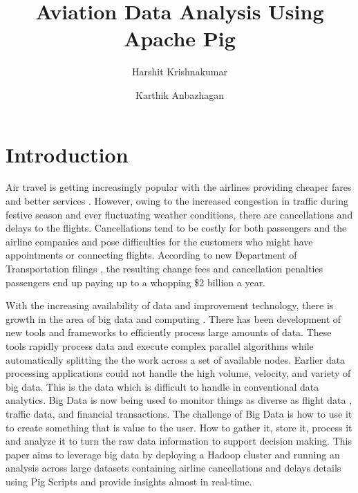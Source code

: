 \documentclass[9pt,twocolumn,twoside]{../../styles/osajnl}
\title{Aviation Data Analysis Using Apache Pig}
\author[1*]{Harshit Krishnakumar}
\author[2]{Karthik Anbazhagan}
\affil[1]{School of Informatics and Computing, Bloomington, IN 47408, U.S.A.}
\affil[2]{School of Informatics and Computing, Bloomington, IN 47408, U.S.A.}
\affil[*]{Corresponding authors: harkrish@iu.edu, kartanba@iu.edu}
\begin{document}
\flushbottom %

\maketitle %

\tableofcontents %
\maketitle

\section{Introduction}
Air travel is getting increasingly popular with the airlines providing cheaper fares and better services \cite{www-aviation-price}. However, owing to the increased congestion in traffic during festive season and ever fluctuating weather conditions, there are cancellations and delays to the flights. Cancellations tend to be costly for both passengers and the airline companies and pose difficulties for the customers who might have appointments or connecting flights. According to new Department of Transportation filings \cite{www-airline}, the resulting change fees and cancellation penalties passengers end up paying up to a whopping \$2 billion a year. 

With the increasing availability of data and improvement technology, there is growth in the area of big data and computing \cite{www-hdfs-arch}. There has been development of new tools and frameworks to efficiently process large amounts of data. These tools rapidly process data and execute complex parallel algorithms while automatically splitting the the work across a set of available nodes. Earlier data processing applications could not handle the high volume, velocity, and variety of big data. This is the data which is difficult to handle in conventional data analytics. Big Data is now being used to monitor things as diverse as flight data \cite{www-aviation}, traffic data, and financial transactions. The challenge of Big Data is how to use it to create something that is value to the user. How to gather it, store it, process it and analyze it to turn the raw data information to support decision making. This paper aims to leverage big data by deploying a Hadoop cluster and running an analysis across large datasets containing airline cancellations and delays details using Pig Scripts and provide insights almost in real-time. 
\end{document}
